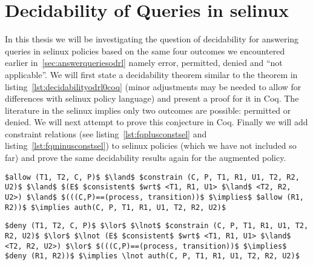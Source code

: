 \section{Decidability of Queries in \ac{selinux}}

In this thesis we will be investigating the question of decidability for answering queries in \ac{selinux} policies based on the same four outcomes we encountered earlier in~\ref{sec:answerqueriesodrl} namely error, permitted, denied and ``not applicable''. We will first state a decidability theorem similar to the theorem in listing~\ref{lst:decidabilityodrl0coq} (minor adjustments may be needed to allow for differences with \ac{selinux} policy language) and present a proof for it in Coq. The literature in the \ac{selinux} implies only two outcomes are possible: permitted or denied. We will next attempt to prove this conjecture in Coq. Finally we will add constraint relations (see listing~\ref{lst:fqplusconstsel} and listing~\ref{lst:fqminusconstsel}) to \ac{selinux} policies (which we have not included so far) and prove the same decidability results again for the augmented policy.

\lstset{mathescape, language=AST} 
\begin{lstlisting}[frame=single, caption={$f^{+}_q$ for \ac{selinux}},label={lst:fqplusconstsel}]
$allow (T1, T2, C, P)$ $\land$ $constrain (C, P, T1, R1, U1, T2, R2, U2)$ $\land$ $(E$ $consistent$ $wrt$ <T1, R1, U1> $\land$ <T2, R2, U2>) $\land$ $(((C,P)==(process, transition))$ $\implies$ $allow (R1, R2))$ $\implies auth(C, P, T1, R1, U1, T2, R2, U2)$ 

\end{lstlisting}

\lstset{mathescape, language=AST} 
\begin{lstlisting}[frame=single, caption={$f^{-}_q$ for \ac{selinux}},label={lst:fqminusconstsel}]
$deny (T1, T2, C, P)$ $\lor$ $\lnot$ $constrain (C, P, T1, R1, U1, T2, R2, U2)$ $\lor$ $\lnot (E$ $consistent$ $wrt$ <T1, R1, U1> $\land$ <T2, R2, U2>) $\lor$ $(((C,P)==(process, transition))$ $\implies$ $deny (R1, R2))$ $\implies \lnot auth(C, P, T1, R1, U1, T2, R2, U2)$ 

\end{lstlisting}
